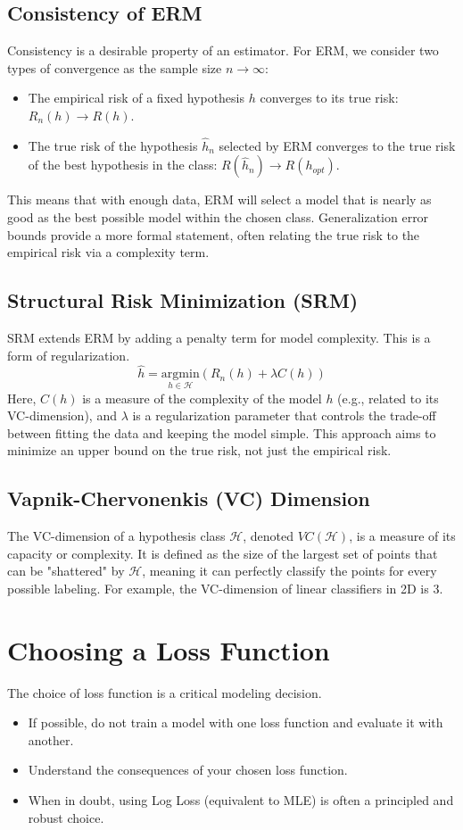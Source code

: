 \documentclass{article}
\begin{document}
\begin{multicols}{2}
\subsection{Consistency of ERM}
Consistency is a desirable property of an estimator. For ERM, we consider two types of convergence as the sample size $n \to \infty$:
\begin{itemize}
    \item The empirical risk of a fixed hypothesis $h$ converges to its true risk: $R_n(h) \to R(h)$.
    \item The true risk of the hypothesis $\hat{h}_n$ selected by ERM converges to the true risk of the best hypothesis in the class: $R(\hat{h}_n) \to R(h_{opt})$.
\end{itemize}
This means that with enough data, ERM will select a model that is nearly as good as the best possible model within the chosen class. Generalization error bounds provide a more formal statement, often relating the true risk to the empirical risk via a complexity term.

\subsection{Structural Risk Minimization (SRM)}
SRM extends ERM by adding a penalty term for model complexity. This is a form of regularization.
$$ \hat{h} = \underset{h \in \mathcal{H}}{\text{argmin}} \left( R_n(h) + \lambda C(h) \right) $$
Here, $C(h)$ is a measure of the complexity of the model $h$ (e.g., related to its VC-dimension), and $\lambda$ is a regularization parameter that controls the trade-off between fitting the data and keeping the model simple. This approach aims to minimize an upper bound on the true risk, not just the empirical risk.

\subsection{Vapnik-Chervonenkis (VC) Dimension}
The VC-dimension of a hypothesis class $\mathcal{H}$, denoted $VC(\mathcal{H})$, is a measure of its capacity or complexity. It is defined as the size of the largest set of points that can be "shattered" by $\mathcal{H}$, meaning it can perfectly classify the points for every possible labeling. For example, the VC-dimension of linear classifiers in 2D is 3.

\section{Choosing a Loss Function}
The choice of loss function is a critical modeling decision.
\begin{itemize}
    \item If possible, do not train a model with one loss function and evaluate it with another.
    \item Understand the consequences of your chosen loss function.
    \item When in doubt, using Log Loss (equivalent to MLE) is often a principled and robust choice.
\end{itemize}


\end{multicols}
\end{document}
